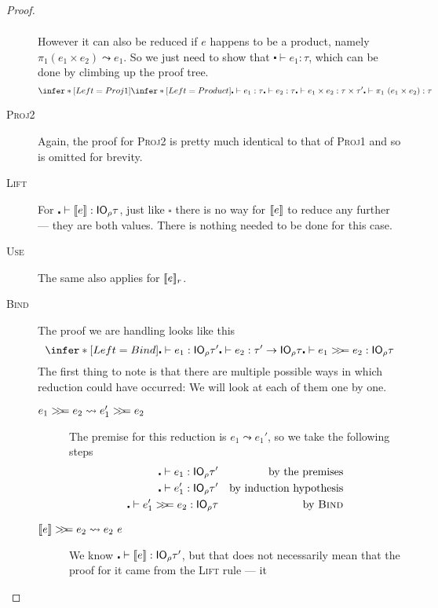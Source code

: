 \begin{proof}
\begin{description}
\begin{align*}
    \end{align*}
    However it can also be reduced if $e$ happens to be a product,
    namely $\pi_1 (e_1 \times e_2) \leadsto e_1$. So we just need to show that
    ${\centerdot \vdash e_1 : \tau}$, which can be done by climbing up the proof tree.
    \[
      \infer*[Left=Proj1]{ \infer*[Left=Product]{\centerdot \vdash e_1 : \tau  \\ \centerdot \vdash
          e_2 : \tau}{\centerdot \vdash e_1
          \times e_2 : \tau \times \tau'} }
      {\centerdot \vdash \pi_1 \ (e_1 \times e_2) : \tau}
    \]
  \item[\rm\textsc{Proj2}] Again, the proof for \textsc{Proj2} is
    pretty much identical to that of \textsc{Proj1} and so is omitted
    for brevity.
  \item[\rm\textsc{Lift}] For
    $\centerdot \vdash \lift{e} : \IO_\rho \tau$, just like $\square$ there is no way
    for $\lift{e}$ to reduce any further --- they are both
    values. There is nothing needed to be done for this case.
  \item[\rm\textsc{Use}] The same also applies for $\use{r}{e}$.
  \item[\rm\textsc{Bind}] The proof we are handling looks like this
    \[ \infer*[Left=Bind]{\centerdot \vdash e_1 : \IO_\rho \tau' \\ \centerdot \vdash e_2 : \tau' \rightarrow \IO_\rho \tau}{\centerdot \vdash e_1 \bind
        e_2 : \IO_\rho \tau} \]
    The first thing to note is that there are
    multiple possible ways in which reduction could have occurred: We
    will look at each of them one by one.
    \begin{description}
    \item[$e_1 \bind e_2 \leadsto e_1' \bind e_2$] The premise for this
      reduction is $e_1 \leadsto e_1'$, so we take the following steps
      \begin{align*}
        \centerdot \vdash e_1 : \IO_\rho \tau' && \text{by the premises} \\
        \centerdot \vdash e_1' : \IO_\rho \tau' && \text{by induction hypothesis} \\
        \centerdot \vdash e_1' \bind e_2 : \IO_\rho \tau && \text{by \textsc{Bind}}
      \end{align*}
    \item[$\lift{e} \bind e_2 \leadsto e_2 \ e$] We know
      $\centerdot \vdash \lift{e} : \IO_\rho \tau'$, but that does not necessarily mean
      that the proof for it came from the \textsc{Lift} rule --- it

\end{description}
\end{description}
\end{proof}
